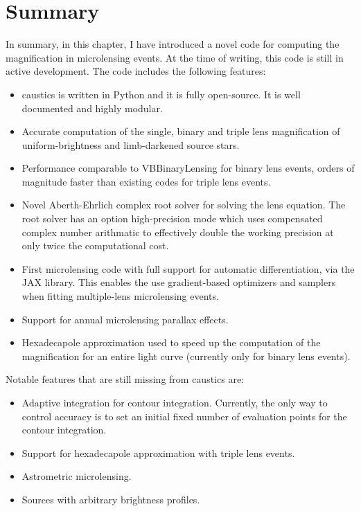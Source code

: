 \documentclass[12pt,dvipsnames]{report}
\newcommand{\ssf}[1]{\textsf{#1}}
\begin{document}
\section{Summary}
\label{sec:exo_summary}
In summary, in this chapter, I have introduced a novel code for computing the magnification
in microlensing events. At the time of writing, this code is still in active development.
The code includes the following features:
\begin{itemize}
    \item \ssf{caustics} is written in Python and it is fully open-source. It is well 
    documented and highly modular.
    \item Accurate computation of the single, binary and triple lens magnification 
    of uniform-brightness and limb-darkened source stars.
    \item Performance comparable to VBBinaryLensing for binary lens events, orders of 
    magnitude faster than existing codes for triple lens events.
    \item Novel Aberth-Ehrlich complex root solver for solving the lens equation. The 
    root solver has an option high-precision mode which uses compensated complex number 
    arithmatic to effectively double the working precision at only twice the computational 
    cost.
    \item First microlensing code with full support for automatic differentiation,
    via the \ssf{JAX} library. This enables the use gradient-based optimizers and 
    samplers when fitting multiple-lens microlensing events.
    \item Support for annual microlensing parallax effects.
    \item Hexadecapole approximation used to speed up the computation of the 
    magnification for an entire light curve (currently only for binary lens events).
\end{itemize}
Notable features that are still missing from \ssf{caustics} are:
\begin{itemize}
    \item Adaptive integration for contour integration. Currently, the only way to control
    accuracy is to set an initial fixed number of evaluation points for the contour 
    integration. 
    \item Support for hexadecapole approximation with triple lens events.
    \item Astrometric microlensing.
    \item Sources with arbitrary brightness profiles.
\end{itemize}
\end{document}
